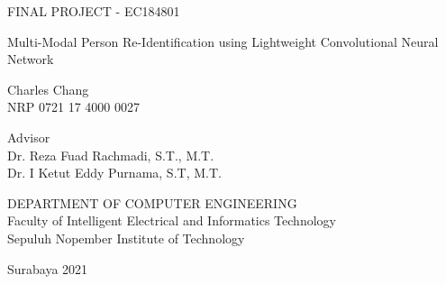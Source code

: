 FINAL PROJECT - EC184801

\vspace{6ex}

\begin{large}
  Multi-Modal Person Re-Identification using Lightweight Convolutional Neural Network
\end{large}

\vspace{4ex}

Charles Chang \\
NRP 0721 17 4000 0027

\vspace{2ex}

Advisor \\
Dr. Reza Fuad Rachmadi, S.T., M.T. \\
Dr. I Ketut Eddy Purnama, S.T, M.T.

\vspace{6ex}

DEPARTMENT OF COMPUTER ENGINEERING \\
Faculty of Intelligent Electrical and Informatics Technology \\
Sepuluh Nopember Institute of Technology

Surabaya 2021
